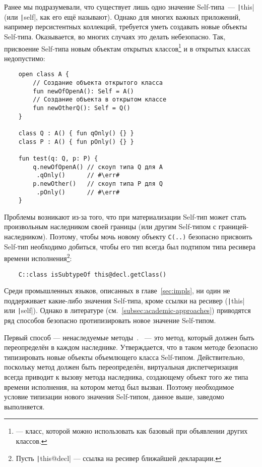 Ранее мы подразумевали, что существует лишь одно значение Self-типа~--- \texttt|this| (или \texttt|self|, как его ещё называют).
Однако для многих важных приложений, например персистентных коллекций, требуется уметь создавать новые объекты Self-типа.
Оказывается, во многих случаях это делать небезопасно.
Так, присвоение Self-типа новым объектам открытых классов\footnote{ --- класс, которой можно использовать как базовый при объявлении других классов.} и в открытых классах недопустимо:

\begin{verbatim}
    open class A {
        // Создание объекта открытого класса
        fun newOfOpenA(): Self = A()
        // Создание объекта в открытом классе
        fun newOtherQ(): Self = Q()
    }

    class Q : A() { fun qOnly() {} }
    class P : A() { fun pOnly() {} }

    fun test(q: Q, p: P) {
        q.newOfOpenA() // скоуп типа Q для A
         .qOnly()      // #\err#
        p.newOther()   // скоуп типа P для Q
         .pOnly()      // #\err#
    }
\end{verbatim}

Проблемы возникают из-за того, что при материализации Self-тип может стать произвольным наследником своей границы (или другим Self-типом с границей-наследником).
Поэтому, чтобы мочь новому объекту \texttt{C(..)} безопасно присвоить Self-тип необходимо добиться, чтобы его тип всегда был подтипом типа ресивера времени исполнения\footnote{Пусть \texttt|this@decl| --- ссылка на ресивер ближайшей декларации.\label{foot:this-decl}}:
\begin{verbatim}
    C::class isSubtypeOf this@decl.getClass()
\end{verbatim}

Среди промышленных языков, описанных в главе~\ref{sec:impls}, ни один не поддерживает какие-либо значения Self-типа, кроме ссылки на ресивер (\texttt|this| или \texttt|self|).
Однако в литературе (см.~\ref{subsec:academic-approaches}) приводятся ряд способов безопасно протипизировать новое значение Self-типом.

Первый способ --- ненаследуемые методы~\cite{saito2009matching}.
~--- это метод, который должен быть переопределён в каждом наследнике.
Утверждается, что в таком методе безопасно типизировать новые объекты объемлющего класса Self-типом.
Действительно, поскольку метод должен быть переопределён, виртуальная диспетчеризация всегда приводит к вызову метода наследника, создающему объект того же типа времени исполнения, на котором метод был вызван.
Поэтому необходимое условие типизации нового значения Self-типом, данное выше, заведомо выполняется.

